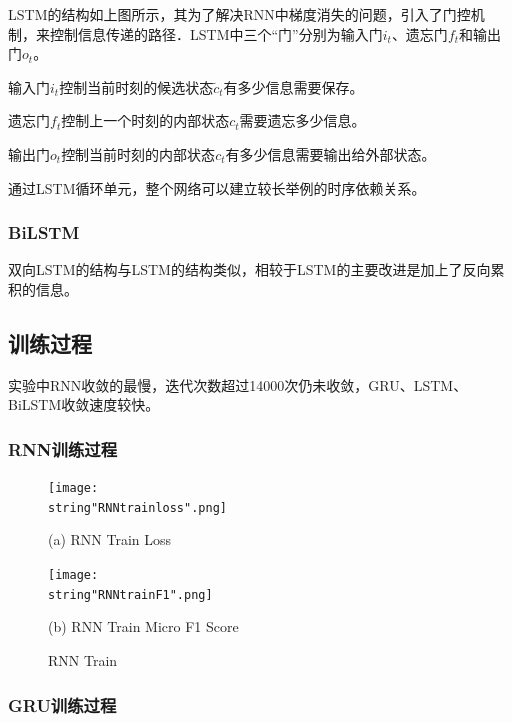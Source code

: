 \documentclass[UTF8]{ctexart}
\begin{document}
LSTM的结构如上图所示，其为了解决RNN中梯度消失的问题，引入了门控机制，来控制信息传递的路径．LSTM中三个“门”分别为输入门$i_{t}$、遗忘门$f_{t}$和输出门$o_{t}$。\par

输入门$i_{t}$控制当前时刻的候选状态$\tilde{c}_{t}$有多少信息需要保存。\par
遗忘门$f_{t}$控制上一个时刻的内部状态$c_{t}$需要遗忘多少信息。 \par
输出门$o_{t}$控制当前时刻的内部状态$c_{t}$有多少信息需要输出给外部状态。 \par
通过LSTM循环单元，整个网络可以建立较长举例的时序依赖关系。

\subsubsection{BiLSTM}
双向LSTM的结构与LSTM的结构类似，相较于LSTM的主要改进是加上了反向累积的信息。  \par

\subsection{训练过程}
实验中RNN收敛的最慢，迭代次数超过14000次仍未收敛，GRU、LSTM、BiLSTM收敛速度较快。\par
\subsubsection{RNN训练过程}

\begin{figure}[H]
    \begin{minipage}[t]{0.5\linewidth}
        \centering
        \texttt{[image: \\string"RNNtrainloss".png]}
        \centerline{(a) RNN Train Loss}
    \end{minipage}%
    \begin{minipage}[t]{0.5\linewidth}
        \centering
        \texttt{[image: \\string"RNNtrainF1".png]}
        \centerline{(b) RNN Train Micro F1 Score}
    \end{minipage}
    \label{fig:4}
    \caption{RNN Train}
\end{figure}



\subsubsection{GRU训练过程}
\end{document}
